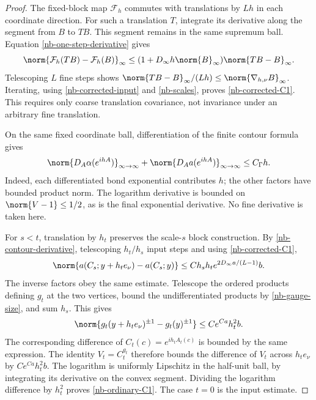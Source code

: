 \begin{proof}
The fixed-block map $\mathcal F_h$ commutes with translations
by $Lh$ in each coordinate direction. For such a translation
$T$, integrate its derivative along the segment from $B$ to
$TB$. This segment remains in the same supremum ball. Equation
\eqref{nb-one-step-derivative} gives
\[
 \norm{\mathcal F_h(TB)-\mathcal F_h(B)}_\infty
  \le(1+D_\infty h\norm{B}_\infty)\norm{TB-B}_\infty.
\]
Telescoping $L$ fine steps shows
$\norm{TB-B}_\infty/(Lh)\le
\norm{\nabla_{h,\nu}B}_\infty$. Iterating, using
\eqref{nb-corrected-input} and \eqref{nb-scales}, proves
\eqref{nb-corrected-C1}. This requires only coarse translation
covariance, not invariance under an arbitrary fine translation.

On the same fixed coordinate ball, differentiation of the
finite contour formula gives
\begin{equation}\label{nb-contour-derivative}
 \norm{D_A\alpha(e^{ihA})}_{\infty\to\infty}
 +\norm{D_Aa(e^{ihA})}_{\infty\to\infty}\le C_\Gamma h.
\end{equation}
Indeed, each differentiated bond exponential contributes $h$;
the other factors have bounded product norm. The logarithm
derivative is bounded on $\norm{V-1}\le1/2$, as is the final
exponential derivative. No fine derivative is taken here.

For $s<t$, translation by $h_t$ preserves the scale-$s$ block
construction. By \eqref{nb-contour-derivative}, telescoping
$h_t/h_s$ input steps and using \eqref{nb-corrected-C1},
\begin{equation}\label{nb-endpoint-spatial-difference}
 \norm{a(C_s;y+h_te_\nu)-a(C_s;y)}
        \le C h_sh_t e^{2D_\infty a/(L-1)}b.
\end{equation}
The inverse factors obey the same estimate. Telescope the
ordered products defining $g_t$ at the two vertices, bound the
undifferentiated products by \eqref{nb-gauge-size}, and sum
$h_s$. This gives
\begin{equation}\label{nb-gauge-spatial-difference}
 \norm{g_t(y+h_te_\nu)^{\pm1}-g_t(y)^{\pm1}}
                         \le C e^{Ca}h_t^2b.
\end{equation}
The corresponding difference of $C_t(c)=e^{ih_tA_t(c)}$
is bounded by the same expression. The identity $V_t=C_t^{g_t}$
therefore bounds the difference of $V_t$ across $h_te_\nu$
by $Ce^{Ca}h_t^2b$. The logarithm is uniformly Lipschitz in
the half-unit ball, by integrating its derivative on the convex
segment. Dividing the logarithm difference by $h_t^2$ proves
\eqref{nb-ordinary-C1}. The case $t=0$ is the input estimate.


\end{proof}
